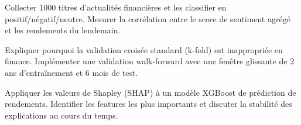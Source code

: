 \begin{exercice}
Collecter 1000 titres d'actualit\'es financi\`eres et les classifier en
positif/n\'egatif/neutre. Mesurer la corr\'elation entre le score de sentiment
agr\'eg\'e et les rendements du lendemain.
\end{exercice}

\begin{exercice}
Expliquer pourquoi la validation crois\'ee standard (k-fold) est
inappropri\'ee en finance. Impl\'ementer une validation walk-forward avec une
fen\^etre glissante de 2 ans d'entra\^inement et 6 mois de test.
\end{exercice}

\begin{exercice}
Appliquer les valeurs de Shapley (SHAP) \`a un mod\`ele XGBoost de pr\'ediction
de rendements. Identifier les features les plus importants et discuter la
stabilit\'e des explications au cours du temps.
\end{exercice}
